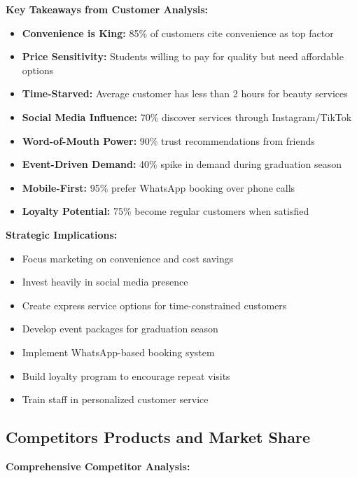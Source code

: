 \begin{tcolorbox}[mybox, title=\textbf{Customer Insights Summary}]
\textbf{Key Takeaways from Customer Analysis:}
\begin{itemize}[leftmargin=1em, itemsep=0pt]
    \item \textbf{Convenience is King:} 85\% of customers cite convenience as top factor
    \item \textbf{Price Sensitivity:} Students willing to pay for quality but need affordable options
    \item \textbf{Time-Starved:} Average customer has less than 2 hours for beauty services
    \item \textbf{Social Media Influence:} 70\% discover services through Instagram/TikTok
    \item \textbf{Word-of-Mouth Power:} 90\% trust recommendations from friends
    \item \textbf{Event-Driven Demand:} 40\% spike in demand during graduation season
    \item \textbf{Mobile-First:} 95\% prefer WhatsApp booking over phone calls
    \item \textbf{Loyalty Potential:} 75\% become regular customers when satisfied
\end{itemize}

\textbf{Strategic Implications:}
\begin{itemize}[leftmargin=1em, itemsep=0pt]
    \item Focus marketing on convenience and cost savings
    \item Invest heavily in social media presence
    \item Create express service options for time-constrained customers
    \item Develop event packages for graduation season
    \item Implement WhatsApp-based booking system
    \item Build loyalty program to encourage repeat visits
    \item Train staff in personalized customer service
\end{itemize}
\end{tcolorbox}

\subsection{Competitors Products and Market Share}

\textbf{Comprehensive Competitor Analysis:}

